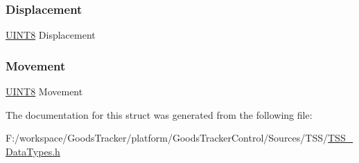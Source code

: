 \mbox{\label{struct_t_s_s___a_s_l_i_d_e_r___d_y_n_aeade839b12fc17a00b9836bf422184c6}} 
\subsubsection{\texorpdfstring{Displacement}{Displacement}}
{\footnotesize\ttfamily \hyperlink{_t_s_s___data_types_8h_ab27e9918b538ce9d8ca692479b375b6a}{U\+I\+N\+T8} Displacement}

\mbox{\label{struct_t_s_s___a_s_l_i_d_e_r___d_y_n_aa5fac4f9f3ed46d5688c0b547f0b757e}} 
\subsubsection{\texorpdfstring{Movement}{Movement}}
{\footnotesize\ttfamily \hyperlink{_t_s_s___data_types_8h_ab27e9918b538ce9d8ca692479b375b6a}{U\+I\+N\+T8} Movement}



The documentation for this struct was generated from the following file\+:\begin{DoxyCompactItemize}
\item 
F\+:/workspace/\+Goods\+Tracker/platform/\+Goods\+Tracker\+Control/\+Sources/\+T\+S\+S/\hyperlink{_t_s_s___data_types_8h}{T\+S\+S\+\_\+\+Data\+Types.\+h}\end{DoxyCompactItemize}
